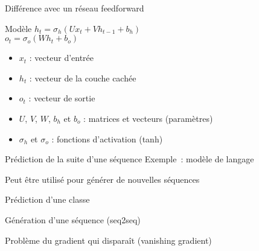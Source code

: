 \begin{frame}{Différence avec un réseau feedforward}
\end{frame}

\begin{frame}{Modèle}
  $h_{t}=\sigma_{h}(Ux_{t}+Vh_{t-1}+b_{h})$ \\
  $o_{t}=\sigma_{o}(Wh_{t}+b_{o})$ \\
  \begin{itemize}
  \item $x_{t}$ : vecteur d'entrée
  \item $h_t$ : vecteur de la couche cachée
  \item $o_{t}$ : vecteur de sortie
  \item $U$, $V$, $W$, $b_h$ et $b_o$ : matrices et vecteurs (paramètres)
  \item $\sigma_{h}$ et $\sigma_o$ : fonctions d'activation (tanh)
  \end{itemize}
\end{frame}

\begin{frame}{Prédiction de la suite d'une séquence}
  Exemple~: modèle de langage


  Peut être utilisé pour générer de nouvelles séquences
\end{frame}

\begin{frame}{Prédiction d'une classe}
\end{frame}

\begin{frame}{Génération d'une séquence (seq2seq)}
\end{frame}

\begin{frame}{Problème du gradient qui disparaît (vanishing gradient)}
\end{frame}
